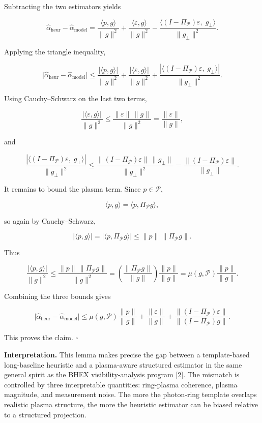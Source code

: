 \documentclass[10pt,letterpaper,twocolumn]{article}
\begin{document}
Subtracting the two estimators yields

\[
\hat\alpha_{\mathrm{heur}}-\hat\alpha_{\mathrm{model}}
=
\frac{\langle p,g\rangle}{\|g\|^2}
+
\frac{\langle \varepsilon,g\rangle}{\|g\|^2}
-
\frac{\langle (I-\Pi_{\mathcal P})\varepsilon,\; g_\perp\rangle}{\|g_\perp\|^2}.
\]

Applying the triangle inequality,

\[
\bigl|\hat\alpha_{\mathrm{heur}}-\hat\alpha_{\mathrm{model}}\bigr|
\le
\frac{|\langle p,g\rangle|}{\|g\|^2}
+
\frac{|\langle \varepsilon,g\rangle|}{\|g\|^2}
+
\frac{|\langle (I-\Pi_{\mathcal P})\varepsilon,\; g_\perp\rangle|}{\|g_\perp\|^2}.
\]

Using Cauchy--Schwarz on the last two terms,

\[
\frac{|\langle \varepsilon,g\rangle|}{\|g\|^2}
\le
\frac{\|\varepsilon\|\,\|g\|}{\|g\|^2}
=
\frac{\|\varepsilon\|}{\|g\|},
\]

and

\[
\frac{|\langle (I-\Pi_{\mathcal P})\varepsilon,\; g_\perp\rangle|}{\|g_\perp\|^2}
\le
\frac{\|(I-\Pi_{\mathcal P})\varepsilon\|\,\|g_\perp\|}{\|g_\perp\|^2}
=
\frac{\|(I-\Pi_{\mathcal P})\varepsilon\|}{\|g_\perp\|}.
\]

It remains to bound the plasma term. Since \(p \in \mathcal P\),

\[
\langle p,g\rangle = \langle p,\Pi_{\mathcal P}g\rangle,
\]

so again by Cauchy--Schwarz,

\[
|\langle p,g\rangle|
=
|\langle p,\Pi_{\mathcal P}g\rangle|
\le
\|p\|\,\|\Pi_{\mathcal P}g\|.
\]

Thus

\[
\frac{|\langle p,g\rangle|}{\|g\|^2}
\le
\frac{\|p\|\,\|\Pi_{\mathcal P}g\|}{\|g\|^2}
=
\left(\frac{\|\Pi_{\mathcal P}g\|}{\|g\|}\right)\frac{\|p\|}{\|g\|}
=
\mu(g,\mathcal P)\frac{\|p\|}{\|g\|}.
\]

Combining the three bounds gives

\[
\bigl|\hat\alpha_{\mathrm{heur}}-\hat\alpha_{\mathrm{model}}\bigr|
\le
\mu(g,\mathcal P)\frac{\|p\|}{\|g\|}
+
\frac{\|\varepsilon\|}{\|g\|}
+
\frac{\|(I-\Pi_{\mathcal P})\varepsilon\|}{\|(I-\Pi_{\mathcal P})g\|}.
\]

This proves the claim. \(\square\)

\par\smallskip\noindent{}\textbf{Interpretation.} This lemma makes
precise the gap between a template-based long-baseline heuristic and a
plasma-aware structured estimator in the same general spirit as the BHEX
visibility-analysis program [\hyperlink{ref-2}{2}]. The mismatch is
controlled by three interpretable quantities: ring-plasma coherence,
plasma magnitude, and measurement noise. The more the photon-ring
template overlaps realistic plasma structure, the more the heuristic
estimator can be biased relative to a structured projection.
\end{document}
